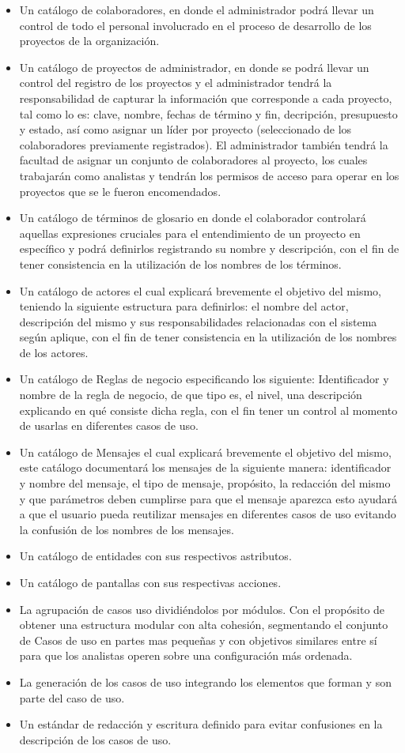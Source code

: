 \begin{itemize}
	\item Un catálogo de colaboradores, en donde el administrador podrá llevar un control de todo el personal involucrado en el proceso de desarrollo de los proyectos de la organización.
	\item Un catálogo de proyectos de administrador, en donde se podrá llevar un control del registro de los proyectos y el administrador tendrá la responsabilidad de capturar la información que corresponde a cada proyecto, tal como lo es: clave, nombre, fechas de término y fin, decripción, presupuesto y estado, así como asignar un líder por proyecto (seleccionado de los colaboradores previamente registrados).
	El administrador también tendrá la facultad de asignar un conjunto de colaboradores al proyecto, los cuales trabajarán como analistas y tendrán los permisos de acceso para operar en los proyectos que se le fueron encomendados.
	\item Un catálogo de términos de glosario en donde el colaborador controlará aquellas expresiones cruciales para el entendimiento de un proyecto en específico y podrá definirlos registrando su nombre y descripción, con el fin de tener consistencia en la utilización de los nombres de los términos.
	\item Un catálogo de actores el cual explicará brevemente el objetivo del mismo, teniendo la siguiente estructura para definirlos: el nombre del actor, descripción del mismo y sus responsabilidades relacionadas con el sistema según aplique, con el fin de tener consistencia en la utilización de los nombres de los actores.
	\item Un catálogo de Reglas de negocio especificando los siguiente: Identificador y nombre de la regla de negocio, de que tipo es, el nivel, una descripción explicando en qué consiste dicha regla, con el fin tener un control al momento de usarlas en diferentes casos de uso.
	\item Un catálogo de Mensajes el cual explicará brevemente el objetivo del mismo, este catálogo documentará los mensajes de la siguiente manera: identificador y nombre del mensaje, el tipo de mensaje, propósito, la redacción del mismo y que parámetros deben cumplirse para que el mensaje aparezca esto ayudará a que el usuario pueda reutilizar mensajes en diferentes casos de uso evitando la confusión de los nombres de los mensajes.
	\item Un catálogo de entidades con sus respectivos astributos.
	\item Un catálogo de pantallas con sus respectivas acciones.
	\item La agrupación de casos uso dividiéndolos por módulos. Con el propósito de obtener una estructura modular con alta cohesión, segmentando el conjunto de Casos de uso en partes mas pequeñas y con objetivos similares entre sí para que los analistas operen sobre una configuración más ordenada.
	\item La generación de los casos de uso integrando los elementos que forman y son parte del caso de uso.
	\item Un estándar de redacción y escritura definido para evitar confusiones en la descripción de los casos de uso.
\end{itemize}
	
